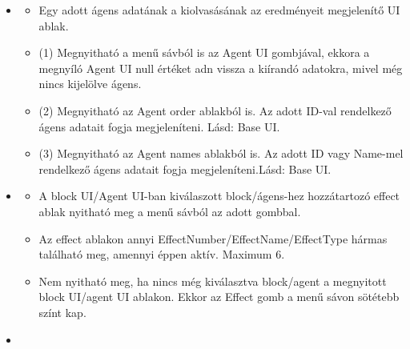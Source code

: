 \begin{itemize}
    \item {}
    
    \begin{itemize}
        \item Egy adott ágens adatának a kiolvasásának az eredményeit megjelenítő UI ablak.
        \item (1) Megnyitható a menű sávból is az Agent UI gombjával, ekkora a megnyíló Agent UI null értéket adn vissza a kiírandó adatokra, mivel még nincs kijelölve ágens.
        \item (2) Megnyitható az Agent order ablakból is. Az adott ID-val rendelkező ágens adatait fogja megjeleníteni. Lásd: Base UI.
        \item (3) Megnyitható az Agent names ablakból is. Az adott ID vagy Name-mel rendelkező ágens adatait fogja megjeleníteni.Lásd: Base UI.
    \end{itemize}

    \item {}
    
    \begin{itemize}
        \item A block UI/Agent UI-ban kiválaszott block/ágens-hez hozzátartozó effect ablak nyitható meg a menű sávból az adott gombbal.
        \item Az effect ablakon annyi EffectNumber/EffectName/EffectType hármas található meg, amennyi éppen aktív. Maximum 6.
        \item Nem nyitható meg, ha nincs még kiválasztva block/agent a megnyitott block UI/agent UI ablakon. Ekkor az Effect gomb a menű sávon sötétebb színt kap.
    \end{itemize}

    \item {}
    

\end{itemize}
